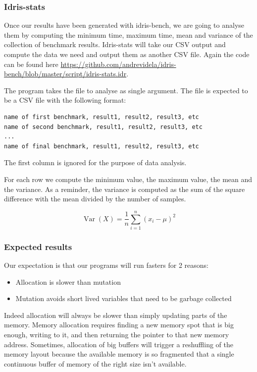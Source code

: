 \documentclass[
]{article}
\providecommand{\tightlist}{%
  \setlength{\itemsep}{0pt}\setlength{\parskip}{0pt}}
\begin{document}
\hypertarget{idris-stats}{%
\subsubsection{Idris-stats}\label{idris-stats}}

Once our results have been generated with idris-bench, we are going to
analyse them by computing the minimum time, maximum time, mean and
variance of the collection of benchmark results. Idris-stats will take
our CSV output and compute the data we need and output them as another
CSV file. Again the code can be found here
\url{https://github.com/andrevidela/idris-bench/blob/master/script/idris-stats.idr}.

The program takes the file to analyse as single argument. The file is
expected to be a CSV file with the following format:

\begin{verbatim}
name of first benchmark, result1, result2, result3, etc
name of second benchmark, result1, result2, result3, etc
...
name of final benchmark, result1, result2, result3, etc
\end{verbatim}

The first column is ignored for the purpose of data analysis.

For each row we compute the minimum value, the maximum value, the mean
and the variance. As a reminder, the variance is computed as the sum of
the square difference with the mean divided by the number of samples.

\[ \operatorname{Var}(X) = \frac{1}{n} \sum_{i=1}^n (x_i - \mu)^2 \]

\hypertarget{expected-results}{%
\subsubsection{Expected results}\label{expected-results}}

Our expectation is that our programs will run fasters for 2 reasons:

\begin{itemize}
\tightlist
\item
  Allocation is slower than mutation
\item
  Mutation avoids short lived variables that need to be garbage
  collected
\end{itemize}

Indeed allocation will always be slower than simply updating parts of
the memory. Memory allocation requires finding a new memory spot that is
big enough, writing to it, and then returning the pointer to that new
memory address. Sometimes, allocation of big buffers will trigger a
reshuffling of the memory layout because the available memory is so
fragmented that a single continuous buffer of memory of the right size
isn't available.
\end{document}
